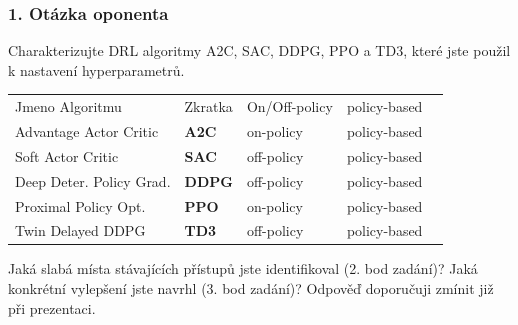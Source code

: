 \begin{frame}
    \frametitle{1. Otázka oponenta}
    \large{Charakterizujte DRL algoritmy A2C, SAC, DDPG, PPO a TD3, které jste použil k nastavení hyperparametrů.}

    \begin{table}
        \centering
        {\footnotesize
            \begin{tabular}{lllll}
                Jmeno Algoritmu          & Zkratka       & On/Off-policy & policy-based \\

                Advantage Actor Critic   & \textbf{A2C}  & on-policy     & policy-based \\
                Soft Actor Critic        & \textbf{SAC}  & off-policy    & policy-based \\
                Deep Deter. Policy Grad. & \textbf{DDPG} & off-policy    & policy-based \\
                Proximal Policy Opt.     & \textbf{PPO}  & on-policy     & policy-based \\
                Twin Delayed DDPG        & \textbf{TD3}  & off-policy    & policy-based \\
            \end{tabular}
        }
        \label{tab:algo}
    \end{table}

    \vspace{1cm}

    \large{Jaká slabá místa stávajících přístupů jste identifikoval (2. bod zadání)? Jaká konkrétní vylepšení jste navrhl (3. bod zadání)? Odpověď doporučuji zmínit již při prezentaci.}
\end{frame}





